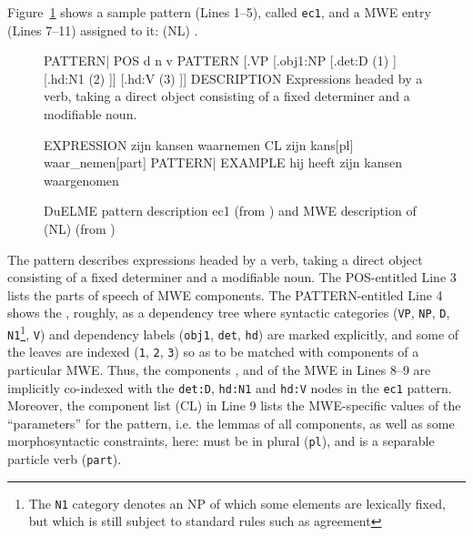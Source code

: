 \documentclass[output=paper]{langsci/langscibook}
\begin{document}
Figure~\ref{lic:fig:duelme} shows a sample pattern (Lines 1--5), called \texttt{ec1}, and a MWE entry (Lines 7--11) assigned to it: (NL) .
\begin{figure}[h]
\begin{duelme}
PATTERN|%
POS d n v
PATTERN  [.VP [.obj1:NP [.det:D (1) ] [.hd:N1 (2) ]] [.hd:V (3) ]]
DESCRIPTION Expressions headed by a verb, taking a direct object consisting of a fixed determiner and a modifiable noun.

EXPRESSION zijn kansen waarnemen
CL zijn kans[pl] waar_nemen[part]
PATTERN|%
EXAMPLE hij heeft zijn kansen waargenomen
\end{duelme}
  \caption{DuELME pattern description ec1 (from \citealt{gregoire:07}) and MWE description of (NL)  (from \citealt{gregoire:10})}
  \label{lic:fig:duelme}   
\end{figure}

The pattern describes expressions headed by a verb, taking a direct object consisting of a fixed determiner and a modifiable noun. The POS-entitled Line 3 lists the parts of speech of MWE components. The PATTERN-entitled Line 4 shows the , roughly, as a dependency tree where syntactic categories (\texttt{VP}, \texttt{NP}, \texttt{D}, \texttt{N1}\footnote{The \texttt{N1} category denotes an NP of which some elements are lexically fixed, but which is still subject to standard  rules such as agreement}, \texttt{V}) and dependency labels (\texttt{obj1}, \texttt{det}, \texttt{hd}) are marked explicitly, and some of the leaves are indexed (\texttt{1}, \texttt{2}, \texttt{3}) so as to be matched with components of a particular MWE. Thus, the components ,  and  of the MWE in Lines 8--9 are implicitly co-indexed with the \texttt{det:D}, \texttt{hd:N1} and \texttt{hd:V} nodes in the \texttt{ec1} pattern. Moreover, the component list (CL) in Line 9 lists the MWE-specific values of the ``parameters'' for the pattern, i.e. the lemmas of all components, as well as some morphosyntactic constraints, here:  must be in plural (\texttt{pl}), and  is a separable particle verb (\texttt{part}). 
\end{document}
